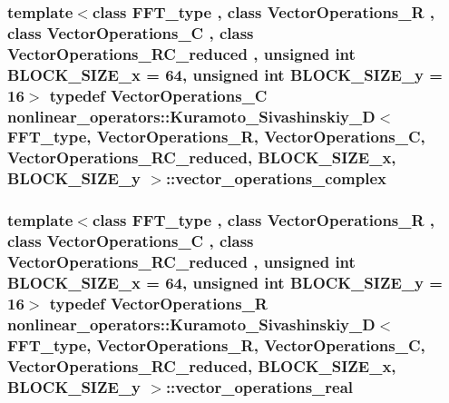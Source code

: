 \hypertarget{classnonlinear__operators_1_1Kuramoto__Sivashinskiy__2D_a4868b14c92e357e368f38f421bd36a08}{
\subsubsection[{vector\-\_\-operations\-\_\-complex}]{\setlength{\rightskip}{0pt plus 5cm}template$<$class F\-F\-T\-\_\-type , class Vector\-Operations\-\_\-\-R , class Vector\-Operations\-\_\-\-C , class Vector\-Operations\-\_\-\-R\-C\-\_\-reduced , unsigned int B\-L\-O\-C\-K\-\_\-\-S\-I\-Z\-E\-\_\-x = 64, unsigned int B\-L\-O\-C\-K\-\_\-\-S\-I\-Z\-E\-\_\-y = 16$>$ typedef Vector\-Operations\-\_\-\-C {\bf nonlinear\-\_\-operators\-::\-Kuramoto\-\_\-\-Sivashinskiy\-\_\-D}$<$ F\-F\-T\-\_\-type, Vector\-Operations\-\_\-\-R, Vector\-Operations\-\_\-\-C, Vector\-Operations\-\_\-\-R\-C\-\_\-reduced, B\-L\-O\-C\-K\-\_\-\-S\-I\-Z\-E\-\_\-x, B\-L\-O\-C\-K\-\_\-\-S\-I\-Z\-E\-\_\-y $>$\-::{\bf vector\-\_\-operations\-\_\-complex}}}\label{classnonlinear__operators_1_1Kuramoto__Sivashinskiy__2D_a4868b14c92e357e368f38f421bd36a08}
\hypertarget{classnonlinear__operators_1_1Kuramoto__Sivashinskiy__2D_aeb1b50af221ad1f1ae0e8e945de23572}{
\subsubsection[{vector\-\_\-operations\-\_\-real}]{\setlength{\rightskip}{0pt plus 5cm}template$<$class F\-F\-T\-\_\-type , class Vector\-Operations\-\_\-\-R , class Vector\-Operations\-\_\-\-C , class Vector\-Operations\-\_\-\-R\-C\-\_\-reduced , unsigned int B\-L\-O\-C\-K\-\_\-\-S\-I\-Z\-E\-\_\-x = 64, unsigned int B\-L\-O\-C\-K\-\_\-\-S\-I\-Z\-E\-\_\-y = 16$>$ typedef Vector\-Operations\-\_\-\-R {\bf nonlinear\-\_\-operators\-::\-Kuramoto\-\_\-\-Sivashinskiy\-\_\-D}$<$ F\-F\-T\-\_\-type, Vector\-Operations\-\_\-\-R, Vector\-Operations\-\_\-\-C, Vector\-Operations\-\_\-\-R\-C\-\_\-reduced, B\-L\-O\-C\-K\-\_\-\-S\-I\-Z\-E\-\_\-x, B\-L\-O\-C\-K\-\_\-\-S\-I\-Z\-E\-\_\-y $>$\-::{\bf vector\-\_\-operations\-\_\-real}}}\label{classnonlinear__operators_1_1Kuramoto__Sivashinskiy__2D_aeb1b50af221ad1f1ae0e8e945de23572}
